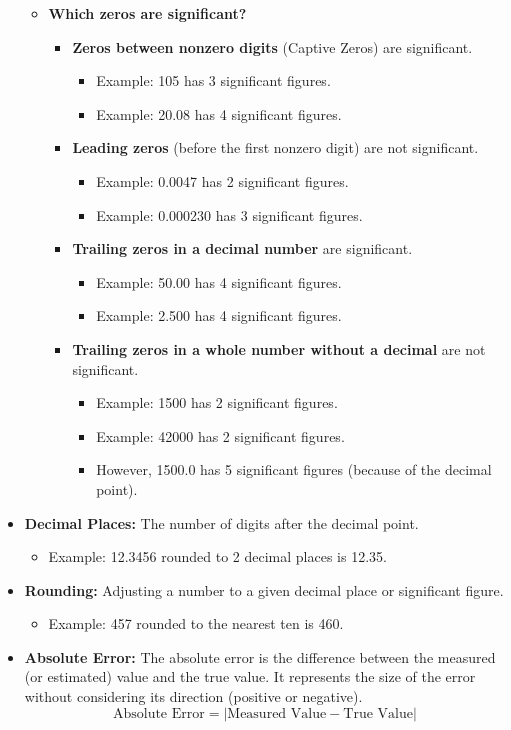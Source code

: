 \begin{itemize}
\begin{itemize}
		\item \textbf{Which zeros are significant?}
		\begin{itemize}
			\item \textbf{Zeros between nonzero digits} (Captive Zeros) are significant.
			\begin{itemize}
				\item Example: 105 has 3 significant figures.
				\item Example: 20.08 has 4 significant figures.
			\end{itemize}
			\item \textbf{Leading zeros} (before the first nonzero digit) are not significant.
			\begin{itemize}
				\item Example: 0.0047 has 2 significant figures.
				\item Example: 0.000230 has 3 significant figures.
			\end{itemize}
			\item \textbf{Trailing zeros in a decimal number} are significant.
			\begin{itemize}
				\item Example: 50.00 has 4 significant figures.
				\item Example: 2.500 has 4 significant figures.
			\end{itemize}
			\item \textbf{Trailing zeros in a whole number without a decimal} are not significant.
			\begin{itemize}
				\item Example: 1500 has 2 significant figures.
				\item Example: 42000 has 2 significant figures.
				\item However, 1500.0 has 5 significant figures (because of the decimal point).
			\end{itemize}
		\end{itemize}
	\end{itemize}
	
	\item \textbf{Decimal Places:} The number of digits after the decimal point.
	\begin{itemize}
		\item Example: 12.3456 rounded to 2 decimal places is 12.35.
	\end{itemize}
	
	\item \textbf{Rounding:} Adjusting a number to a given decimal place or significant figure.
	\begin{itemize}
		\item Example: 457 rounded to the nearest ten is 460.
	\end{itemize}
	\item \textbf{Absolute Error:}  
	The absolute error is the difference between the measured (or estimated) value and the true value. It represents the size of the error without considering its direction (positive or negative).  
	\[
	\text{Absolute Error} = |\text{Measured Value} - \text{True Value}|
	\]
	

\end{itemize}
